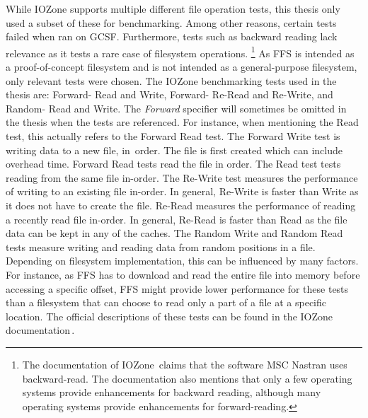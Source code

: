 While IOZone supports multiple different file operation tests, this thesis only used a subset of these for benchmarking. Among other reasons, certain tests failed when ran on \gls{GCSF}. Furthermore, tests such as backward reading lack relevance as it tests a rare case of filesystem operations. \footnote{The documentation of IOZone\,\cite{iozoneIozoneFilesystemBenchmark} claims that the software MSC Nastran uses \mbox{backward-read}. The documentation also mentions that only a few operating systems provide enhancements for backward reading, although many operating systems provide enhancements for \mbox{forward-reading}.} As \gls{FFS} is intended as a \mbox{proof-of-concept} filesystem and is not intended as a \mbox{general-purpose} filesystem, only relevant tests were chosen. The IOZone benchmarking tests used in the thesis are: Forward- Read and Write, Forward- \mbox{Re-Read} and \mbox{Re-Write}, and Random- Read and Write. The \textit{Forward} specifier will sometimes be omitted in the thesis when the tests are referenced. For instance, when mentioning the Read test, this actually refers to the Forward Read test. The Forward Write test is writing data to a new file, \mbox{in order}. The file is first created which can include overhead time. Forward Read tests read the file in order. The Read test tests reading from the same file \mbox{in-order}. The \mbox{Re-Write} test measures the performance of writing to an existing file \mbox{in-order}. In general, \mbox{Re-Write} is faster than Write as it does not have to create the file. \mbox{Re-Read} measures the performance of reading a recently read file \mbox{in-order}. In general, \mbox{Re-Read} is faster than \mbox{Read} as the file data can be kept in any of the caches. The Random Write and Random Read tests measure writing and reading data from random positions in a file. Depending on filesystem implementation, this can be influenced by many factors. For instance, as \gls{FFS} has to download and read the entire file into memory before accessing a specific offset, \gls{FFS} might provide lower performance for these tests than a filesystem that can choose to read only a part of a file at a specific location. The official descriptions of these tests can be found in the IOZone documentation\,\cite{iozoneIozoneFilesystemBenchmark}.

